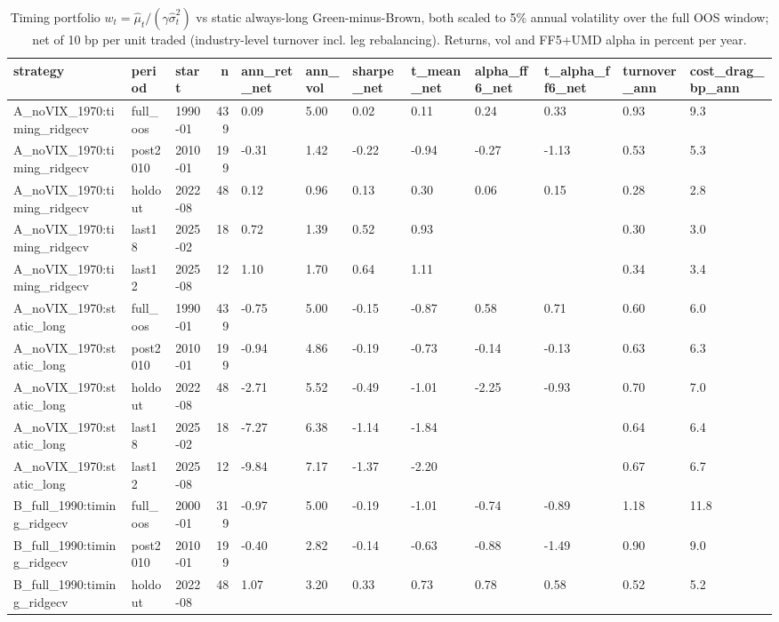 \begin{table}
\caption{Timing portfolio $w_t=\hat{\mu}_t/(\gamma\hat{\sigma}^2_t)$ vs static always-long Green-minus-Brown, both scaled to 5\% annual volatility over the full OOS window; net of 10 bp per unit traded (industry-level turnover incl. leg rebalancing). Returns, vol and FF5+UMD alpha in percent per year.}
\label{tab:m6_portfolio}
\begin{tabular}{lllrllllllll}
\toprule
strategy & period & start & n & ann\_ret\_net & ann\_vol & sharpe\_net & t\_mean\_net & alpha\_ff6\_net & t\_alpha\_ff6\_net & turnover\_ann & cost\_drag\_bp\_ann \\
\midrule
A\_noVIX\_1970:timing\_ridgecv & full\_oos & 1990-01 & 439 & 0.09 & 5.00 & 0.02 & 0.11 & 0.24 & 0.33 & 0.93 & 9.3 \\
A\_noVIX\_1970:timing\_ridgecv & post2010 & 2010-01 & 199 & -0.31 & 1.42 & -0.22 & -0.94 & -0.27 & -1.13 & 0.53 & 5.3 \\
A\_noVIX\_1970:timing\_ridgecv & holdout & 2022-08 & 48 & 0.12 & 0.96 & 0.13 & 0.30 & 0.06 & 0.15 & 0.28 & 2.8 \\
A\_noVIX\_1970:timing\_ridgecv & last18 & 2025-02 & 18 & 0.72 & 1.39 & 0.52 & 0.93 &  &  & 0.30 & 3.0 \\
A\_noVIX\_1970:timing\_ridgecv & last12 & 2025-08 & 12 & 1.10 & 1.70 & 0.64 & 1.11 &  &  & 0.34 & 3.4 \\
A\_noVIX\_1970:static\_long & full\_oos & 1990-01 & 439 & -0.75 & 5.00 & -0.15 & -0.87 & 0.58 & 0.71 & 0.60 & 6.0 \\
A\_noVIX\_1970:static\_long & post2010 & 2010-01 & 199 & -0.94 & 4.86 & -0.19 & -0.73 & -0.14 & -0.13 & 0.63 & 6.3 \\
A\_noVIX\_1970:static\_long & holdout & 2022-08 & 48 & -2.71 & 5.52 & -0.49 & -1.01 & -2.25 & -0.93 & 0.70 & 7.0 \\
A\_noVIX\_1970:static\_long & last18 & 2025-02 & 18 & -7.27 & 6.38 & -1.14 & -1.84 &  &  & 0.64 & 6.4 \\
A\_noVIX\_1970:static\_long & last12 & 2025-08 & 12 & -9.84 & 7.17 & -1.37 & -2.20 &  &  & 0.67 & 6.7 \\
B\_full\_1990:timing\_ridgecv & full\_oos & 2000-01 & 319 & -0.97 & 5.00 & -0.19 & -1.01 & -0.74 & -0.89 & 1.18 & 11.8 \\
B\_full\_1990:timing\_ridgecv & post2010 & 2010-01 & 199 & -0.40 & 2.82 & -0.14 & -0.63 & -0.88 & -1.49 & 0.90 & 9.0 \\
B\_full\_1990:timing\_ridgecv & holdout & 2022-08 & 48 & 1.07 & 3.20 & 0.33 & 0.73 & 0.78 & 0.58 & 0.52 & 5.2 \\

\end{tabular}
\end{table}
